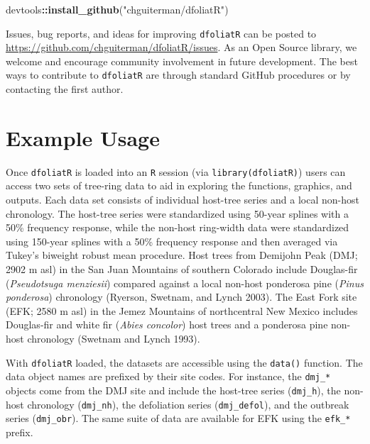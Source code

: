 \documentclass[review]{elsarticle} %
\newenvironment{Shaded}{\begin{snugshade}}{\end{snugshade}}
\newcommand{\KeywordTok}[1]{\textcolor[rgb]{0.13,0.29,0.53}{\textbf{#1}}}
\newcommand{\NormalTok}[1]{#1}
\newcommand{\OperatorTok}[1]{\textcolor[rgb]{0.81,0.36,0.00}{\textbf{#1}}}
\newcommand{\StringTok}[1]{\textcolor[rgb]{0.31,0.60,0.02}{#1}}
\begin{document}
\begin{Shaded}
\begin{Highlighting}[]
\NormalTok{devtools}\OperatorTok{::}\KeywordTok{install_github}\NormalTok{(}\StringTok{"chguiterman/dfoliatR"}\NormalTok{)}
\end{Highlighting}
\end{Shaded}

Issues, bug reports, and ideas for improving \texttt{dfoliatR} can be posted to \url{https://github.com/chguiterman/dfoliatR/issues}. As an Open Source library, we welcome and encourage community involvement in future development. The best ways to contribute to \texttt{dfoliatR} are through standard GitHub procedures or by contacting the first author.

\hypertarget{example-usage}{%
\section{Example Usage}\label{example-usage}}

Once \texttt{dfoliatR} is loaded into an \texttt{R} session (via \texttt{library(dfoliatR)}) users can access two sets of tree-ring data to aid in exploring the functions, graphics, and outputs. Each data set consists of individual host-tree series and a local non-host chronology. The host-tree series were standardized using 50-year splines with a 50\% frequency response, while the non-host ring-width data were standardized using 150-year splines with a 50\% frequency response and then averaged via Tukey's biweight robust mean procedure. Host trees from Demijohn Peak (DMJ; 2902 m asl) in the San Juan Mountains of southern Colorado include Douglas-fir (\emph{Pseudotsuga menziesii}) compared against a local non-host ponderosa pine (\emph{Pinus ponderosa}) chronology (Ryerson, Swetnam, and Lynch 2003). The East Fork site (EFK; 2580 m asl) in the Jemez Mountains of northcentral New Mexico includes Douglas-fir and white fir (\emph{Abies concolor}) host trees and a ponderosa pine non-host chronology (Swetnam and Lynch 1993).

With \texttt{dfoliatR} loaded, the datasets are accessible using the \texttt{data()} function. The data object names are prefixed by their site codes. For instance, the \texttt{dmj\_*} objects come from the DMJ site and include the host-tree series (\texttt{dmj\_h}), the non-host chronology (\texttt{dmj\_nh}), the defoliation series (\texttt{dmj\_defol}), and the outbreak series (\texttt{dmj\_obr}). The same suite of data are available for EFK using the \texttt{efk\_*} prefix.
\end{document}
